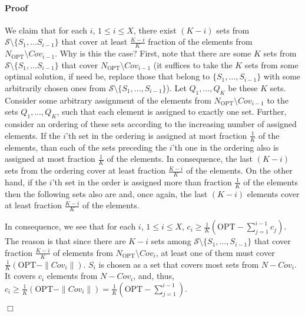 \documentclass[11pt]{article}
\newcommand{\OPT}{{{{\mathrm{OPT}}}}}
\newcommand{\Cov}{{{\mathit{Cov}}}}
\newenvironment{proof}{\paragraph{Proof}}{\hfill$\Box$\medskip}
\newcommand{\calS}{{{\mathcal{S}}}}
\begin{document}
\begin{proof}
  We claim that for each $i$, $1 \leq i \leq X$, there exist $(K-i)$
  sets from $\calS \setminus \{S_1, \dots S_{i-1}\}$ that cover at
  least $\frac{K-i}{K}$ fraction of the elements from $N_{\OPT}
  \setminus \Cov_{i-1}$. Why is this the case? First, note that there
  are some $K$ sets from $\calS \setminus \{S_1, \dots S_{i-1}\}$ that
  cover $N_{\OPT} \setminus \Cov_{i-1}$ (it suffices to take the $K$
  sets from some optimal solution, if need be, replace those that
  belong to $\{S_1, \ldots, S_{i-1}\}$ with some arbitrarily chosen
  ones from $\calS \setminus \{S_1, \ldots, S_{i-1}\}$). Let $Q_1,
  \ldots, Q_K$ be these $K$ sets.  Consider some arbitrary assignment
  of the elements from $N_{\OPT} \setminus \Cov_{i-1}$ to the sets
  $Q_1, \ldots, Q_K$, such that each element is assigned to exactly
  one set. Further, consider an ordering of these sets according to
  the increasing number of assigned elements. If the $i$'th set in the
  ordering is assigned at most fraction $\frac{1}{K}$ of the elements,
  than each of the sets preceding the $i$'th one in the ordering also
  is assigned at most fraction $\frac{1}{K}$ of the elements. In
  consequence, the last $(K-i)$ sets from the ordering cover at least
  fraction $\frac{K-i}{K}$ of the elements. On the other hand, if the
  $i$'th set in the order is assigned more than fraction $\frac{1}{K}$
  of the elements then the following sets also are and, once again,
  the last $(K-i)$ elements cover at least fraction $\frac{K-i}{K}$ of
  the elements.

  In consequence, we see that for each $i$, $1 \leq i \leq X$, $c_i
  \geq \frac{1}{K}(\OPT - \sum_{j = 1}^{i-1} c_j)$. The reason is that
  since there are $K-i$ sets among $\calS \setminus \{S_1, \ldots,
  S_{i-1}\}$ that cover fraction $\frac{K-i}{K}$ of elements from
  $N_\OPT \setminus \Cov_i$, at least one of them must cover
  $\frac{1}{K}(\OPT - \|\Cov_i\|)$.  $S_i$ is chosen as a set that
  covers most sets from $N - \Cov_i$. It covers $c_i$ elements from $N
  - \Cov_i$, and, thus, $c_i \geq \frac{1}{K}(\OPT - \|\Cov_i\|) =
  \frac{1}{K}(\OPT - \sum_{j=1}^{i-1})$.



\end{proof}
\end{document}
